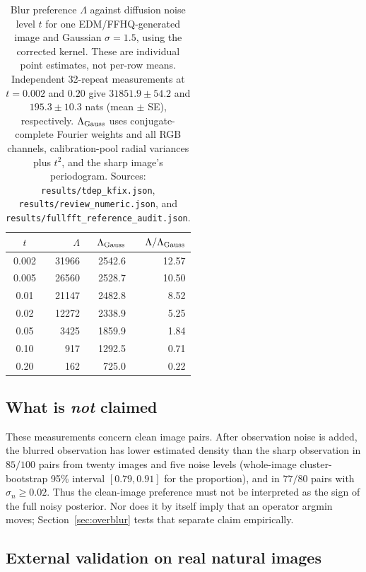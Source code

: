 \documentclass[10pt,journal]{IEEEtran}
\newcommand{\Lam}{\Lambda}
\begin{document}
\begin{table}[t]
  \centering
  \caption{Blur preference $\Lam$ against diffusion noise level $t$ for one EDM/FFHQ-generated
  image and Gaussian $\sigma=1.5$, using the corrected kernel. These are individual point
  estimates, not per-row means. Independent 32-repeat measurements at $t=0.002$ and $0.20$ give
  $31851.9\pm54.2$ and $195.3\pm10.3$ nats (mean $\pm$ SE), respectively. $\Lam_{\rm Gauss}$
  uses conjugate-complete Fourier weights and all RGB channels, calibration-pool radial variances
  plus $t^2$, and the sharp image's periodogram. Sources: \texttt{results/tdep\_kfix.json},
  \texttt{results/review\_numeric.json}, and \texttt{results/fullfft\_reference\_audit.json}.}
  \label{tab:lamt}
  \begin{tabular}{crrr}
    \toprule
    $t$ & $\Lam$ & $\Lam_{\rm Gauss}$ & $\Lam/\Lam_{\rm Gauss}$ \\
    \midrule
    0.002 & 31966 & 2542.6 & 12.57 \\
    0.005 & 26560 & 2528.7 & 10.50 \\
    0.01  & 21147 & 2482.8 &  8.52 \\
    0.02  & 12272 & 2338.9 &  5.25 \\
    0.05  &  3425 & 1859.9 &  1.84 \\
    0.10  &   917 & 1292.5 &  0.71 \\
    0.20  &   162 &  725.0 &  0.22 \\
    \bottomrule
  \end{tabular}
\end{table}

\subsection{What is \emph{not} claimed}
These measurements concern clean image pairs. After observation noise is added, the blurred
observation has lower estimated density than the sharp observation in $85/100$ pairs from twenty
images and five noise levels (whole-image cluster-bootstrap 95\% interval $[0.79,0.91]$ for the
proportion), and in $77/80$ pairs with $\sigma_n\ge0.02$. Thus the clean-image preference must
not be interpreted as the sign of the full noisy posterior. Nor does it by itself imply that an
operator argmin moves; Section~\ref{sec:overblur} tests that separate claim empirically.

\subsection{External validation on real natural images}
\label{sec:real}
\end{document}
